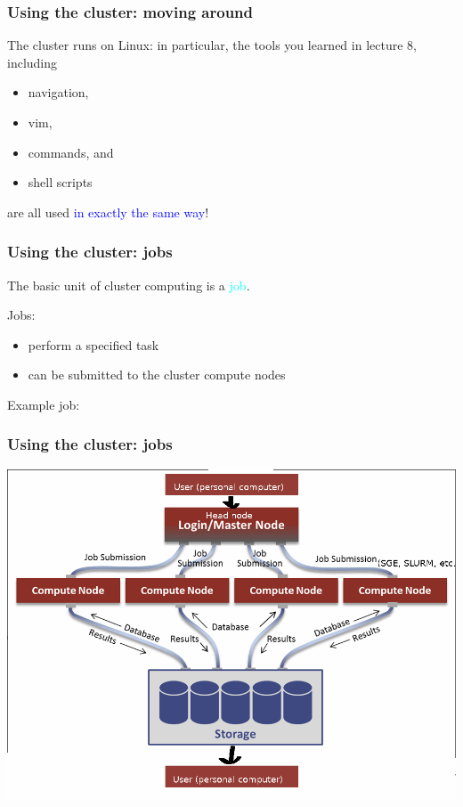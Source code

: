 \documentclass[12pt, 
hyperref={colorlinks=true, linkcolor=BlueViolet, urlcolor=BlueViolet},dvipsnames]{beamer}
\begin{document}
\begin{frame}
\frametitle{Using the cluster: moving around}
The cluster runs on Linux: in particular, the tools you learned in lecture 8, including \vspace{-0.3cm} \pause
\begin{itemize}
\item navigation, \pause
\item vim, \pause
\item commands, \pause and
\item shell scripts
\end{itemize}
are all used \textcolor{blue}{in exactly the same way}!
\end{frame}

\begin{frame}
\frametitle{Using the cluster: jobs}
The basic unit of cluster computing is a \textcolor{cyan}{job}. \pause

Jobs: \vspace{-0.3cm} \pause
\begin{itemize}
\item perform a specified task \pause
\item can be submitted to the cluster compute nodes \pause
\end{itemize}

Example job: 
\end{frame}

\begin{frame}
\frametitle{Using the cluster: jobs}
\begin{center}
\includegraphics[width = 1\textwidth]{plots/hpc_system.png}
\end{center}
\end{frame}
\end{document}
